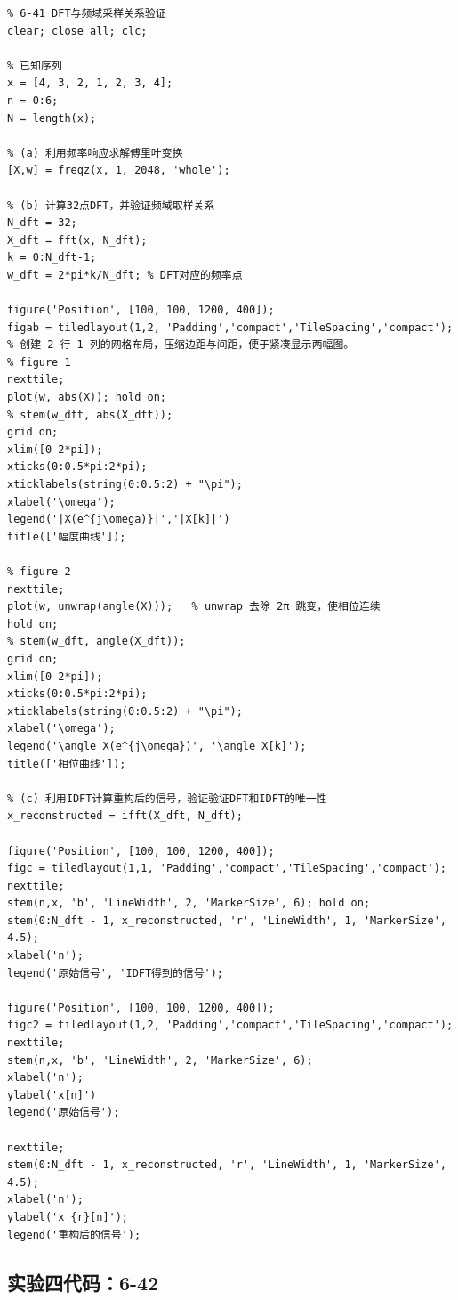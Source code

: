 \documentclass[UTF8,12pt,a4paper]{ctexart}
\begin{document}
\begin{lstlisting}
% 6-41 DFT与频域采样关系验证
clear; close all; clc;

% 已知序列
x = [4, 3, 2, 1, 2, 3, 4];
n = 0:6;
N = length(x);

% (a) 利用频率响应求解傅里叶变换
[X,w] = freqz(x, 1, 2048, 'whole');

% (b) 计算32点DFT，并验证频域取样关系
N_dft = 32;
X_dft = fft(x, N_dft);
k = 0:N_dft-1;
w_dft = 2*pi*k/N_dft; % DFT对应的频率点

figure('Position', [100, 100, 1200, 400]);
figab = tiledlayout(1,2, 'Padding','compact','TileSpacing','compact');  % 创建 2 行 1 列的网格布局，压缩边距与间距，便于紧凑显示两幅图。
% figure 1
nexttile; 
plot(w, abs(X)); hold on;
% stem(w_dft, abs(X_dft));
grid on; 
xlim([0 2*pi]);
xticks(0:0.5*pi:2*pi);
xticklabels(string(0:0.5:2) + "\pi");
xlabel('\omega'); 
legend('|X(e^{j\omega)}|','|X[k]|')
title(['幅度曲线']);

% figure 2
nexttile; 
plot(w, unwrap(angle(X)));   % unwrap 去除 2π 跳变，使相位连续
hold on;
% stem(w_dft, angle(X_dft));
grid on; 
xlim([0 2*pi]);
xticks(0:0.5*pi:2*pi);
xticklabels(string(0:0.5:2) + "\pi");
xlabel('\omega'); 
legend('\angle X(e^{j\omega})', '\angle X[k]'); 
title(['相位曲线']);

% (c) 利用IDFT计算重构后的信号，验证验证DFT和IDFT的唯一性
x_reconstructed = ifft(X_dft, N_dft);

figure('Position', [100, 100, 1200, 400]);
figc = tiledlayout(1,1, 'Padding','compact','TileSpacing','compact');
nexttile; 
stem(n,x, 'b', 'LineWidth', 2, 'MarkerSize', 6); hold on;
stem(0:N_dft - 1, x_reconstructed, 'r', 'LineWidth', 1, 'MarkerSize', 4.5);
xlabel('n');
legend('原始信号', 'IDFT得到的信号');

figure('Position', [100, 100, 1200, 400]);
figc2 = tiledlayout(1,2, 'Padding','compact','TileSpacing','compact');
nexttile; 
stem(n,x, 'b', 'LineWidth', 2, 'MarkerSize', 6);
xlabel('n');
ylabel('x[n]')
legend('原始信号');

nexttile;
stem(0:N_dft - 1, x_reconstructed, 'r', 'LineWidth', 1, 'MarkerSize', 4.5);
xlabel('n');
ylabel('x_{r}[n]');
legend('重构后的信号');
\end{lstlisting}

\subsection{实验四代码：6-42}
\end{document}
